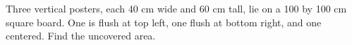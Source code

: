 Three vertical posters, each 40 cm wide and 60 cm tall, lie on a 100 by 100 cm square board. One is flush at top left, one flush at bottom right, and one centered. Find the uncovered area.
